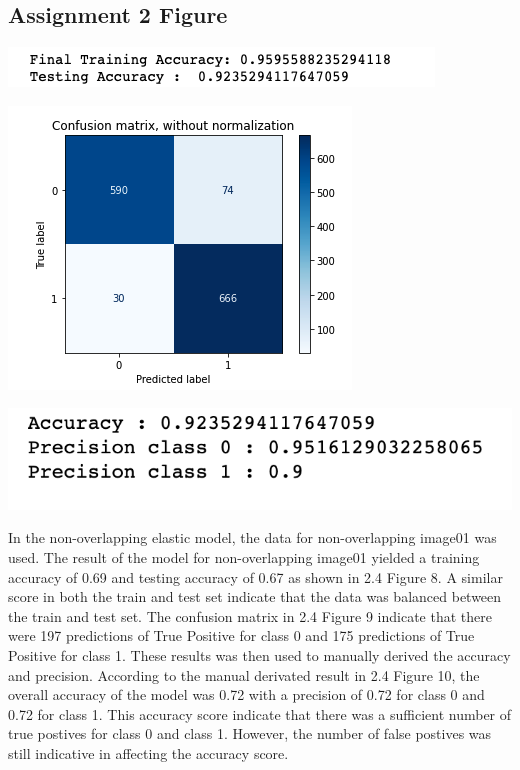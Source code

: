 \documentclass[12pt]{article}
\begin{document}
\begin{multicols*}{2}
  \subsection{Assignment 2 Figure} 
  \begin{center}
        \includegraphics[scale=0.5]{../screenshot/Rf-Overlapping01/score.png}

        \includegraphics[scale=0.5]{../screenshot/Rf-Overlapping01/cf.png}

        \includegraphics[scale=0.5]{../screenshot/Rf-Overlapping01/calc_score.png}

  \end{center}

  \hspace*{5mm} In the non-overlapping elastic model, the data for non-overlapping image01 was used. The result of the model for
  non-overlapping image01 yielded a training accuracy of 0.69 and testing accuracy of 0.67 as shown in 2.4 Figure 8. A similar 
  score in both the train and test set indicate that the data was balanced between the train and test set. The confusion matrix in 2.4 
  Figure 9 indicate that there were 197 predictions of True Positive for class 0 and 175 predictions of True Positive for class 1. These
  results was then used to manually derived the accuracy and precision. According to the manual derivated result in 2.4 Figure 10, the overall
  accuracy of the model was 0.72 with a precision of 0.72 for class 0 and 0.72 for class 1. This accuracy score indicate that there was a sufficient
  number of true postives for class 0 and class 1. However, the number of false postives was still indicative in affecting the accuracy score.



\end{multicols*}
\end{document}
